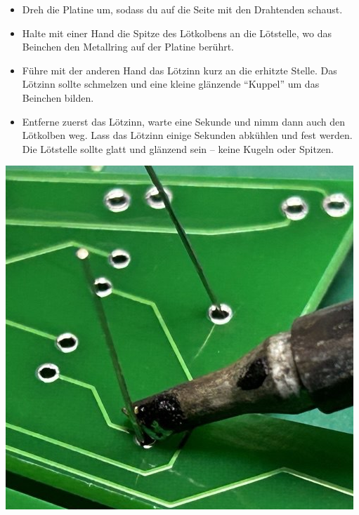 \documentclass[10pt]{article}
\begin{document}
\begin{itemize}
		\begin{minipage}{0.9\textwidth}
			\begin{itemize}
				\item Dreh die Platine um, sodass du auf die Seite mit den Drahtenden schaust.
				\item Halte mit einer Hand die Spitze des Lötkolbens an die Lötstelle, wo das Beinchen den Metallring auf der Platine berührt.
				\item Führe mit der anderen Hand das Lötzinn kurz an die erhitzte Stelle. Das Lötzinn sollte schmelzen und eine kleine glänzende \enquote{Kuppel} um das Beinchen bilden.
				\item Entferne zuerst das Lötzinn, warte eine Sekunde und nimm dann auch den Lötkolben weg. Lass das Lötzinn einige Sekunden abkühlen und fest werden.  Die Lötstelle sollte glatt und glänzend sein – keine Kugeln oder Spitzen.
			\end{itemize}
		\end{minipage}
			\begin{minipage}{0.08\textwidth}\raggedleft
			\includegraphics[width=\linewidth]{solder-both.png}

\end{minipage}
\end{itemize}
\end{document}

